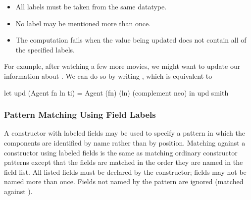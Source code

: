 \begin{itemize}
\item All labels must be taken from the same datatype.
\item No label may be mentioned more than once.
\item The computation fails when the value being updated does not contain all of the specified
labels.
\end{itemize}


\noindent
For example, after watching a few more movies, we might want to update
our information about . We can do so by writing
, which is equivalent to
\begin{curry}
let upd (Agent fn ln ti) = Agent (fn) (ln) (complement neo)
 in upd smith
\end{curry}

\subsubsection{Pattern Matching Using Field Labels}\label{flab-pat}

A constructor with labeled fields may be used to specify a pattern in
which the components are identified by name rather than by position.
Matching against a constructor using labeled fields is the same as
matching ordinary constructor patterns except that the fields are
matched in the order they are named in the field list. All listed
fields must be declared by the constructor; fields may not be named
more than once. Fields not named by the pattern are ignored (matched
against \code{\us}).


